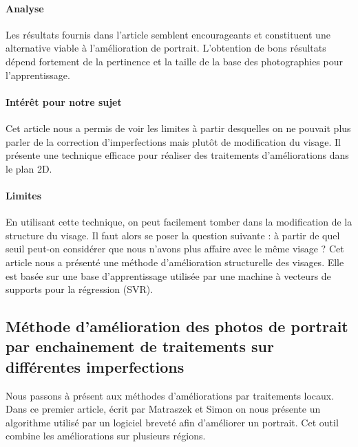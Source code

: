 \documentclass[11pt, french]{report-rd-info}
\begin{document}
\paragraph{Analyse}
Les résultats fournis dans l’article semblent encourageants et constituent une alternative viable à l’amélioration de portrait. L’obtention de bons résultats dépend fortement de la pertinence et la taille de la base des photographies pour l’apprentissage.
\paragraph{Intérêt pour notre sujet}
Cet article nous a permis de voir les limites à partir desquelles on ne pouvait plus parler de la correction d’imperfections mais plutôt de modification du visage. Il présente une technique efficace pour réaliser des traitements d’améliorations dans le plan 2D.
\paragraph{Limites}
En utilisant cette technique, on peut facilement tomber dans la modification de la structure du visage. Il faut alors se poser la question suivante : à partir de quel seuil peut-on considérer que nous n’avons plus affaire avec le même visage ?
Cet article nous a présenté une méthode d’amélioration structurelle des visages. Elle est basée sur une base d’apprentissage utilisée par une machine à vecteurs de supports pour la régression (SVR).
\subsection{Méthode d’amélioration des photos de portrait par enchainement de traitements sur différentes imperfections}
Nous passons à présent aux méthodes d’améliorations par traitements locaux. Dans ce premier article, écrit par Matraszek et Simon\cite{Matraszek2004} on nous présente un algorithme utilisé par un logiciel breveté afin d'améliorer un portrait. Cet outil combine les améliorations sur plusieurs régions.
\end{document}
